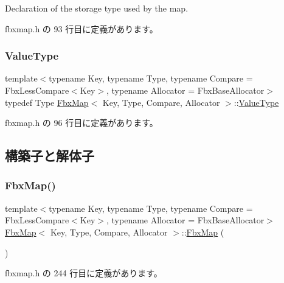 Declaration of the storage type used by the map. 



 fbxmap.\+h の 93 行目に定義があります。

\mbox{\label{class_fbx_map_abea530b1192b31c3cf05fbf247e3dcaa}} 
\subsubsection{\texorpdfstring{Value\+Type}{ValueType}}
{\footnotesize\ttfamily template$<$typename Key, typename Type, typename Compare = Fbx\+Less\+Compare$<$\+Key$>$, typename Allocator = Fbx\+Base\+Allocator$>$ \\
typedef Type \hyperlink{class_fbx_map}{Fbx\+Map}$<$ Key, Type, Compare, Allocator $>$\+::\hyperlink{class_fbx_map_abea530b1192b31c3cf05fbf247e3dcaa}{Value\+Type}}



 fbxmap.\+h の 96 行目に定義があります。



\subsection{構築子と解体子}
\mbox{\label{class_fbx_map_a273b204e69895fed84c1193491f992c8}} 
\subsubsection{\texorpdfstring{Fbx\+Map()}{FbxMap()}\hspace{0.1cm}{\footnotesize\ttfamily [1/2]}}
{\footnotesize\ttfamily template$<$typename Key, typename Type, typename Compare = Fbx\+Less\+Compare$<$\+Key$>$, typename Allocator = Fbx\+Base\+Allocator$>$ \\
\hyperlink{class_fbx_map}{Fbx\+Map}$<$ Key, Type, Compare, Allocator $>$\+::\hyperlink{class_fbx_map}{Fbx\+Map} (\begin{DoxyParamCaption}{ }\end{DoxyParamCaption})\hspace{0.3cm}{\ttfamily [inline]}}



 fbxmap.\+h の 244 行目に定義があります。

